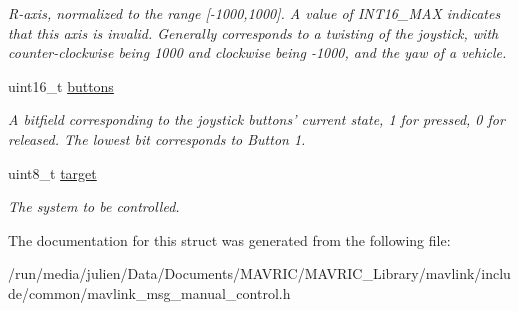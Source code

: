 \begin{DoxyCompactItemize}
\begin{DoxyCompactList}\small\item\em R-\/axis, normalized to the range \mbox{[}-\/1000,1000\mbox{]}. A value of I\+N\+T16\+\_\+\+M\+A\+X indicates that this axis is invalid. Generally corresponds to a twisting of the joystick, with counter-\/clockwise being 1000 and clockwise being -\/1000, and the yaw of a vehicle. \end{DoxyCompactList}\item 
\hypertarget{struct____mavlink__manual__control__t_addf991277abf6fad36b842fdba36fd89}{uint16\+\_\+t \hyperlink{struct____mavlink__manual__control__t_addf991277abf6fad36b842fdba36fd89}{buttons}}\label{struct____mavlink__manual__control__t_addf991277abf6fad36b842fdba36fd89}

\begin{DoxyCompactList}\small\item\em A bitfield corresponding to the joystick buttons' current state, 1 for pressed, 0 for released. The lowest bit corresponds to Button 1. \end{DoxyCompactList}\item 
\hypertarget{struct____mavlink__manual__control__t_ac69f96effc87ea6377989b2350a2a4eb}{uint8\+\_\+t \hyperlink{struct____mavlink__manual__control__t_ac69f96effc87ea6377989b2350a2a4eb}{target}}\label{struct____mavlink__manual__control__t_ac69f96effc87ea6377989b2350a2a4eb}

\begin{DoxyCompactList}\small\item\em The system to be controlled. \end{DoxyCompactList}\end{DoxyCompactItemize}


The documentation for this struct was generated from the following file\+:\begin{DoxyCompactItemize}
\item 
/run/media/julien/\+Data/\+Documents/\+M\+A\+V\+R\+I\+C/\+M\+A\+V\+R\+I\+C\+\_\+\+Library/mavlink/include/common/mavlink\+\_\+msg\+\_\+manual\+\_\+control.\+h\end{DoxyCompactItemize}
